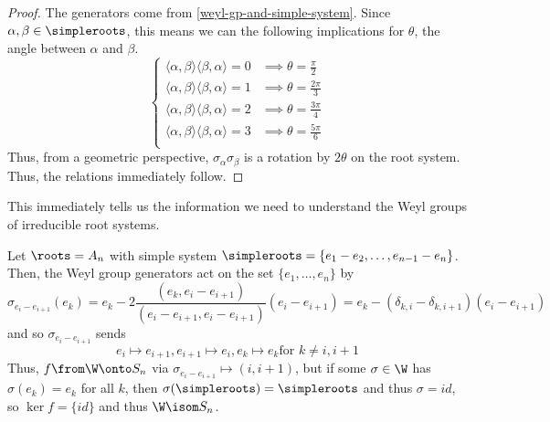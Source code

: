 \documentclass[11pt,leqno,oneside]{amsart}
\numberwithin{thm}{section}
\renewcommand{\Sym}{S}
\begin{document}
\begin{proof}
  The generators come from \ref{weyl-gp-and-simple-system}. Since
  \(\alpha, \beta \in \simpleroots\), this means we can the following
  implications for \(\theta\), the angle between \(\alpha\)  and
  \(\beta\). \[
    \begin{cases}
      \langle \alpha,\beta \rangle\langle \beta,\alpha \rangle = 0
      & \implies \theta = \frac{\pi}{2} \\
      \langle \alpha,\beta \rangle\langle \beta,\alpha \rangle = 1
      & \implies \theta = \frac{2\pi}{3} \\
      \langle \alpha,\beta \rangle\langle \beta,\alpha \rangle = 2
      & \implies \theta = \frac{3\pi}{4} \\
      \langle \alpha,\beta \rangle\langle \beta,\alpha \rangle = 3
      & \implies \theta = \frac{5\pi}{6} \\
    \end{cases}
  \]
  Thus, from a geometric perspective, \(\sigma_\alpha \sigma_\beta\)
  is a rotation by \(2\theta\) on the root system. Thus, the relations
  immediately follow. 
\end{proof}
This immediately tells us the information we need to understand the
Weyl groups of irreducible root systems.
\begin{example}
  Let \(\roots = A_n\) with simple system \(\simpleroots = \{e_1-e_2,
  \ldots, e_{n-1}-e_n\}\). Then, the Weyl group generators act on the
  set \(\{e_1, \ldots, e_n\}\) by \[
    \sigma_{e_i-e_{i+1}}(e_k) = e_k -
    2\frac{(e_k,e_i-e_{i+1})}{(e_i-e_{i+1}, e_i-e_{i+1})}(e_i -
    e_{i+1}) = e_k - (\delta_{k,i}-\delta_{k,i+1})(e_i-e_{i+1})
  \]
  and so \(\sigma_{e_i-e_{i+1}}\) sends \[
    e_i \mapsto e_{i+1}, e_{i+1} \mapsto e_i, e_k \mapsto e_k \text{
      for }k \neq i,i+1
  \]
  Thus, \(f \from \W \onto \Sym_n\) via \(\sigma_{e_i-e_{i+1}} \mapsto
  (i,i+1)\), but if some \(\sigma \in \W\) has \(\sigma(e_k) = e_k\)
  for all \(k\), then \(\sigma(\simpleroots) = \simpleroots\) and thus
  \(\sigma = id\), so \(\ker f = \{id\}\) and thus \(\W \isom \Sym_n\).
\end{example}
\end{document}
